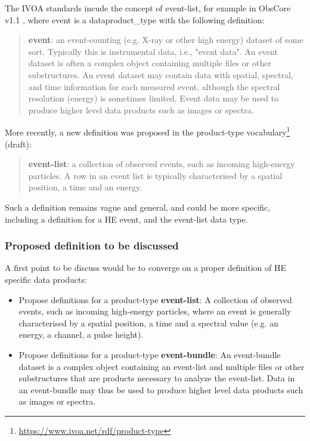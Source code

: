 \documentclass[11pt,a4paper]{ivoa}
\begin{document}
The IVOA standards incude the concept of event-list, for example in ObsCore v1.1 \citep{2017ivoa.spec.0509L}, where event is a dataproduct\_type with the following definition:
\begin{quote}
    \textbf{event}: an event-counting (e.g. X-ray or other high energy) dataset of some sort. Typically this is instrumental data, i.e., "event data". An event dataset is often a complex object containing multiple files or other substructures. An event dataset may contain data with spatial, spectral, and time information for each measured event, although the spectral resolution (energy) is sometimes limited. Event data may be used to produce higher level data products such as images or spectra.
\end{quote}

More recently, a new definition was proposed in the product-type vocabulary\footnote{\url{https://www.ivoa.net/rdf/product-type}} (draft):
\begin{quote}
    \textbf{event-list}: a collection of observed events, such as incoming high-energy particles. A row in an event list is typically characterised by a spatial position, a time and an energy.
\end{quote}

Such a definition remains vague and general, and could be more specific, including a definition for a HE event, and the event-list data type.

\subsubsection{Proposed definition to be discussed}

A first point to be discuss would be to converge on a proper definition of HE specific data products:
\begin{itemize}
    \item Propose definitions for a product-type \textbf{event-list}: A collection of observed events, such as incoming high-energy particles, where an event is generally characterised by a spatial position, a time and a spectral value (e.g. an energy, a channel, a pulse height).
    \item Propose definitions for a product-type \textbf{event-bundle}: An event-bundle dataset is a complex object containing an event-list and multiple files or other substructures that are products necessary to analyze the event-list. Data in an event-bundle may thus be used to produce higher level data products such as images or spectra.
\end{itemize}
\end{document}
